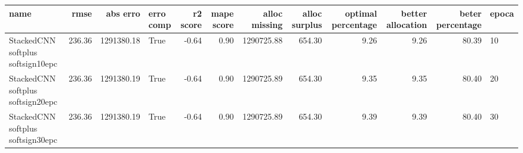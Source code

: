\begin{tabular}{lrrlrrrrrrrl}
\toprule
name & rmse & abs erro & erro comp & r2 score & mape score & alloc missing & alloc surplus & optimal percentage & better allocation & beter percentage & epoca \\
\midrule
StackedCNN softplus softsign10epc & 236.36 & 1291380.18 & True & -0.64 & 0.90 & 1290725.88 & 654.30 & 9.26 & 9.26 & 80.39 & 10 \\
StackedCNN softplus softsign20epc & 236.36 & 1291380.19 & True & -0.64 & 0.90 & 1290725.89 & 654.30 & 9.35 & 9.35 & 80.40 & 20 \\
StackedCNN softplus softsign30epc & 236.36 & 1291380.19 & True & -0.64 & 0.90 & 1290725.89 & 654.30 & 9.39 & 9.39 & 80.40 & 30 \\
\bottomrule
\end{tabular}
